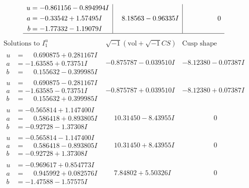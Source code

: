 \documentclass[1p]{elsarticle_modified}
\theoremstyle{definition}
\newcommand{\I}{\sqrt{-1}}
\begin{document}
$$\begin{array}{c|c|c}
\begin{aligned}
u &= -0.861156 - 0.894994 I \\
a &= -0.33542 + 1.57495 I \\
b &= -1.77332 - 1.19079 I\end{aligned}
 & \phantom{-}8.18563 - 0.96335 I & \phantom{-0.000000 } 0\\
 \hline 
 \end{array}$$\newpage$$\begin{array}{c|c|c}  
\text{Solutions to }I^u_{1}& \I (\text{vol} + \sqrt{-1}CS) & \text{Cusp shape}\\
 \hline 
\begin{aligned}
u &= \phantom{-}0.690875 + 0.281167 I \\
a &= -1.63585 + 0.73751 I \\
b &= \phantom{-}0.155632 - 0.399985 I\end{aligned}
 & -0.875787 - 0.039510 I & -8.12380 - 0.07387 I \\ \hline\begin{aligned}
u &= \phantom{-}0.690875 - 0.281167 I \\
a &= -1.63585 - 0.73751 I \\
b &= \phantom{-}0.155632 + 0.399985 I\end{aligned}
 & -0.875787 + 0.039510 I & -8.12380 + 0.07387 I \\ \hline\begin{aligned}
u &= -0.565814 + 1.147400 I \\
a &= \phantom{-}0.586418 + 0.893805 I \\
b &= -0.92728 - 1.37308 I\end{aligned}
 & \phantom{-}10.31450 - 8.43955 I & \phantom{-0.000000 } 0 \\ \hline\begin{aligned}
u &= -0.565814 - 1.147400 I \\
a &= \phantom{-}0.586418 - 0.893805 I \\
b &= -0.92728 + 1.37308 I\end{aligned}
 & \phantom{-}10.31450 + 8.43955 I & \phantom{-0.000000 } 0 \\ \hline\begin{aligned}
u &= -0.969617 + 0.854773 I \\
a &= \phantom{-}0.945992 + 0.082576 I \\
b &= -1.47588 - 1.57575 I\end{aligned}
 & \phantom{-}7.84802 + 5.50326 I & \phantom{-0.000000 } 0 \\ \hline\begin{aligned}

\end{aligned}
\end{array}$$
\end{document}
